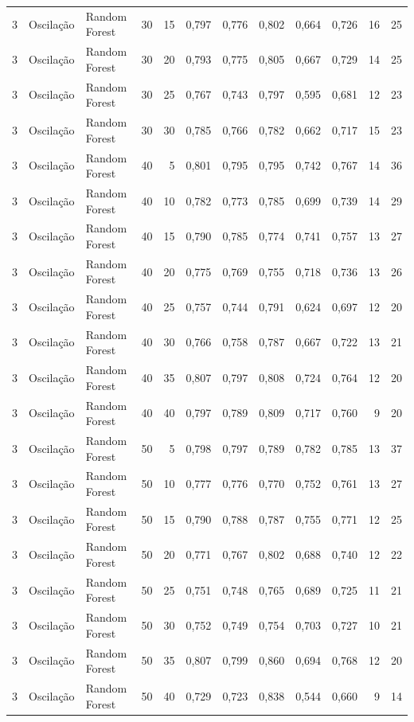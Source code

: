 \begin{longtable}{@{}rllrrrrrrrrr@{}}
3 & Oscilação & Random Forest & 30 & 15 & 0,797 & 0,776 & 0,802 & 0,664 & 0,726 & 16 & 25 \\
3 & Oscilação & Random Forest & 30 & 20 & 0,793 & 0,775 & 0,805 & 0,667 & 0,729 & 14 & 25 \\
3 & Oscilação & Random Forest & 30 & 25 & 0,767 & 0,743 & 0,797 & 0,595 & 0,681 & 12 & 23 \\
3 & Oscilação & Random Forest & 30 & 30 & 0,785 & 0,766 & 0,782 & 0,662 & 0,717 & 15 & 23 \\
3 & Oscilação & Random Forest & 40 & 5 & 0,801 & 0,795 & 0,795 & 0,742 & 0,767 & 14 & 36 \\
3 & Oscilação & Random Forest & 40 & 10 & 0,782 & 0,773 & 0,785 & 0,699 & 0,739 & 14 & 29 \\
3 & Oscilação & Random Forest & 40 & 15 & 0,790 & 0,785 & 0,774 & 0,741 & 0,757 & 13 & 27 \\
3 & Oscilação & Random Forest & 40 & 20 & 0,775 & 0,769 & 0,755 & 0,718 & 0,736 & 13 & 26 \\
3 & Oscilação & Random Forest & 40 & 25 & 0,757 & 0,744 & 0,791 & 0,624 & 0,697 & 12 & 20 \\
3 & Oscilação & Random Forest & 40 & 30 & 0,766 & 0,758 & 0,787 & 0,667 & 0,722 & 13 & 21 \\
3 & Oscilação & Random Forest & 40 & 35 & 0,807 & 0,797 & 0,808 & 0,724 & 0,764 & 12 & 20 \\
3 & Oscilação & Random Forest & 40 & 40 & 0,797 & 0,789 & 0,809 & 0,717 & 0,760 & 9 & 20 \\
3 & Oscilação & Random Forest & 50 & 5 & 0,798 & 0,797 & 0,789 & 0,782 & 0,785 & 13 & 37 \\
3 & Oscilação & Random Forest & 50 & 10 & 0,777 & 0,776 & 0,770 & 0,752 & 0,761 & 13 & 27 \\
3 & Oscilação & Random Forest & 50 & 15 & 0,790 & 0,788 & 0,787 & 0,755 & 0,771 & 12 & 25 \\
3 & Oscilação & Random Forest & 50 & 20 & 0,771 & 0,767 & 0,802 & 0,688 & 0,740 & 12 & 22 \\
3 & Oscilação & Random Forest & 50 & 25 & 0,751 & 0,748 & 0,765 & 0,689 & 0,725 & 11 & 21 \\
3 & Oscilação & Random Forest & 50 & 30 & 0,752 & 0,749 & 0,754 & 0,703 & 0,727 & 10 & 21 \\
3 & Oscilação & Random Forest & 50 & 35 & 0,807 & 0,799 & 0,860 & 0,694 & 0,768 & 12 & 20 \\
3 & Oscilação & Random Forest & 50 & 40 & 0,729 & 0,723 & 0,838 & 0,544 & 0,660 & 9 & 14 \\

\end{longtable}
